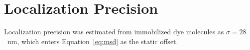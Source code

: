 \chapter{Localization Precision}
\label{app:a}

Localization precision was estimated from immobilized dye molecules as $\sigma = 28$~nm, which
enters Equation~\eqref{eq:msd} as the static offset.
